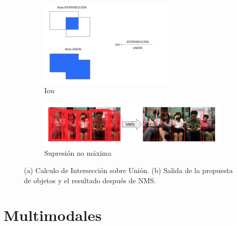 \begin{center}
\noindent{}
\end{center}
\begin{figure}[]
	\begin{subfigure}{.4\textwidth}
		\centering
		\includegraphics[width=0.7\textwidth]{img/iou.png}
		\caption{Iou}
		\label{fig:IoU}
	\end{subfigure}
	\begin{subfigure}{.6\textwidth}
		\centering
		\centering
		\includegraphics[width=1.1\textwidth]{img/NMS.png}
		\caption{Supresión no máxima}
		\label{fig:NMS}
	\end{subfigure}
	\caption{(a) Calculo de Intersección sobre Unión. (b) Salida de la propuesta de objetos y el resultado después de NMS.}
		\label{fig:RP}
\end{figure}

\section{Multimodales}

